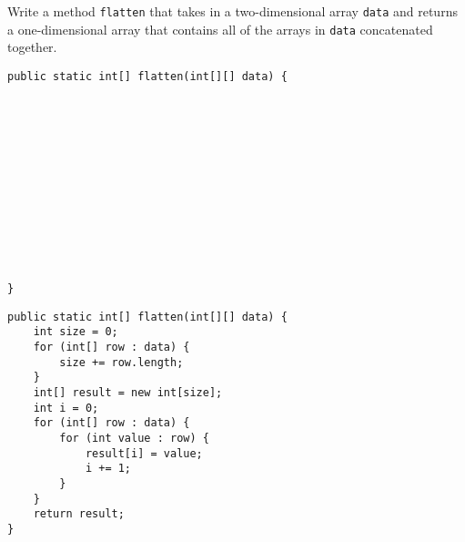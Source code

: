 \begin{blocksection}
\question Write a method \lstinline$flatten$ that takes in a two-dimensional array
\lstinline$data$ and returns a one-dimensional array that contains all of the
arrays in \lstinline$data$ concatenated together.

\ifprintanswers\else
\begin{lstlisting}
public static int[] flatten(int[][] data) {













}
\end{lstlisting}
\fi

\begin{solution}
\begin{lstlisting}
public static int[] flatten(int[][] data) {
    int size = 0;
    for (int[] row : data) {
        size += row.length;
    }
    int[] result = new int[size];
    int i = 0;
    for (int[] row : data) {
        for (int value : row) {
            result[i] = value;
            i += 1;
        }
    }
    return result;
}
\end{lstlisting}
\end{solution}
\end{blocksection}
